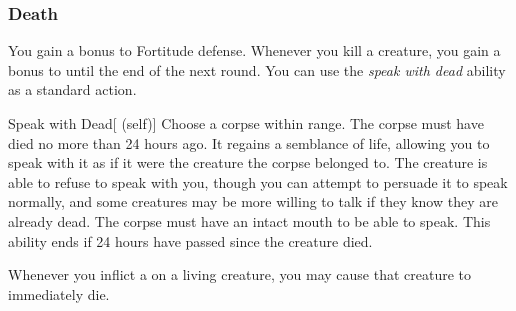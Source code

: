         \subsubsection{Death}
             You gain a  bonus to Fortitude defense.
             Whenever you kill a creature, you gain a  bonus to  until the end of the next round.
             You can use the \textit{speak with dead} ability as a standard action.
            \begin{attuneability}{Speak with Dead}[ (self)]
                Choose a corpse within \rngshort range.
                The corpse must have died no more than 24 hours ago.
                It regains a semblance of life, allowing you to speak with it as if it were the creature the corpse belonged to.
                The creature is able to refuse to speak with you, though you can attempt to persuade it to speak normally, and some creatures may be more willing to talk if they know they are already dead.
                The corpse must have an intact mouth to be able to speak.
                This ability ends if 24 hours have passed since the creature died.
            \end{attuneability}
             Whenever you inflict a  on a living creature, you may cause that creature to immediately die.

